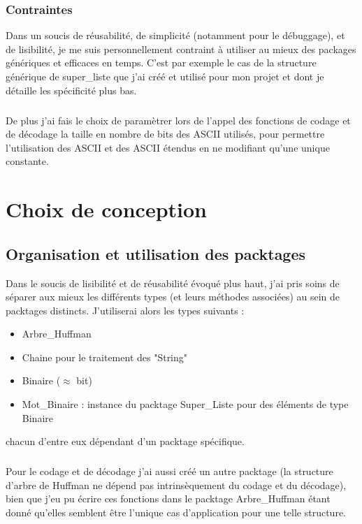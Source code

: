 \documentclass{book}
\begin{document}
\subsection*{Contraintes}
Dans un soucis de réusabilité, de simplicité (notamment pour le débuggage), et de lisibilité, je me suis personnellement contraint à utiliser au mieux des packages génériques et efficaces en temps. C'est par exemple le cas de la structure générique de super\_liste que j'ai créé et utilisé pour mon projet et dont je détaille les spécificité plus bas.
\paragraph{}
De plus j'ai fais le choix de paramètrer lors de l'appel des fonctions de codage et de décodage la taille en nombre de bits des ASCII utilisés, pour permettre l'utilisation des ASCII et des ASCII étendus en ne modifiant qu'une unique constante.




\chapter{Choix de conception}

\section{Organisation et utilisation des packtages}
Dans le soucis de lisibilité et de réusabilité évoqué plus haut, j'ai pris soins de séparer aux mieux les différents types (et leurs méthodes associées) au sein de packtages distincts. J'utiliserai alors les types suivants :
\begin{itemize}
	\item Arbre\_Huffman
	\item Chaine pour le traitement des "String"
	\item Binaire ($\approx$ bit)
	\item Mot\_Binaire : instance du packtage Super\_Liste pour des éléments de type Binaire
\end{itemize}
chacun d'entre eux dépendant d'un packtage spécifique.
\paragraph{}
Pour le codage et de décodage j'ai aussi créé un autre packtage (la structure d'arbre de Huffman ne dépend pas intrinsèquement du codage et du décodage), bien que j'eu pu écrire ces fonctions dans le packtage Arbre\_Huffman étant donné qu'elles semblent être l'unique cas d'application pour une telle structure.
\end{document}

